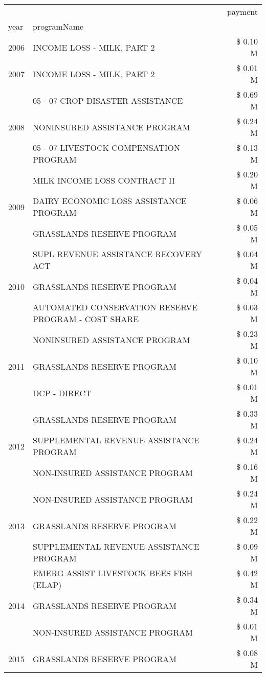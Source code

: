 \begin{tabular}{llr}
\toprule
 &  & payment \\
year & programName &  \\
\midrule
2006 & INCOME LOSS - MILK, PART 2 & \$ 0.10 M \\
\cline{1-3}
2007 & INCOME LOSS - MILK, PART 2 & \$ 0.01 M \\
\cline{1-3}
\multirow[t]{3}{*}{2008} & 05 - 07 CROP DISASTER ASSISTANCE & \$ 0.69 M \\
 & NONINSURED ASSISTANCE PROGRAM & \$ 0.24 M \\
 & 05 - 07 LIVESTOCK COMPENSATION PROGRAM & \$ 0.13 M \\
\cline{1-3}
\multirow[t]{3}{*}{2009} & MILK INCOME LOSS CONTRACT II & \$ 0.20 M \\
 & DAIRY ECONOMIC LOSS ASSISTANCE PROGRAM & \$ 0.06 M \\
 & GRASSLANDS RESERVE PROGRAM & \$ 0.05 M \\
\cline{1-3}
\multirow[t]{3}{*}{2010} & SUPL REVENUE ASSISTANCE RECOVERY ACT & \$ 0.04 M \\
 & GRASSLANDS RESERVE PROGRAM & \$ 0.04 M \\
 & AUTOMATED CONSERVATION RESERVE PROGRAM - COST SHARE & \$ 0.03 M \\
\cline{1-3}
\multirow[t]{3}{*}{2011} & NONINSURED ASSISTANCE PROGRAM & \$ 0.23 M \\
 & GRASSLANDS RESERVE PROGRAM & \$ 0.10 M \\
 & DCP - DIRECT & \$ 0.01 M \\
\cline{1-3}
\multirow[t]{3}{*}{2012} & GRASSLANDS RESERVE PROGRAM & \$ 0.33 M \\
 & SUPPLEMENTAL REVENUE ASSISTANCE PROGRAM & \$ 0.24 M \\
 & NON-INSURED ASSISTANCE PROGRAM & \$ 0.16 M \\
\cline{1-3}
\multirow[t]{3}{*}{2013} & NON-INSURED ASSISTANCE PROGRAM & \$ 0.24 M \\
 & GRASSLANDS RESERVE PROGRAM & \$ 0.22 M \\
 & SUPPLEMENTAL REVENUE ASSISTANCE PROGRAM & \$ 0.09 M \\
\cline{1-3}
\multirow[t]{3}{*}{2014} & EMERG ASSIST LIVESTOCK BEES FISH (ELAP) & \$ 0.42 M \\
 & GRASSLANDS RESERVE PROGRAM & \$ 0.34 M \\
 & NON-INSURED ASSISTANCE PROGRAM & \$ 0.01 M \\
\cline{1-3}
\multirow[t]{3}{*}{2015} & GRASSLANDS RESERVE PROGRAM & \$ 0.08 M \\

\end{tabular}

